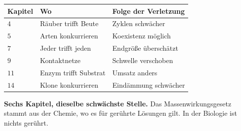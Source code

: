 \begin{merksatz}
\begin{center}
{\small
\renewcommand{\arraystretch}{1.48}
\begin{tabular}{@{}P{1.8cm}P{3.0cm}P{3.4cm}@{}}
\toprule
\textbf{Kapitel} & \textbf{Wo} & \textbf{Folge der Verletzung}\\
\midrule
$4$ & Räuber trifft Beute & Zyklen schwächer\\
$5$ & Arten konkurrieren & Koexistenz möglich\\
$7$ & Jeder trifft jeden & Endgröße überschätzt\\
$9$ & Kontaktnetze & Schwelle verschoben\\
$11$ & Enzym trifft Substrat & Umsatz anders\\
$14$ & Klone konkurrieren & Eindämmung schwächer\\
\bottomrule
\end{tabular}}
\end{center}

\begin{center}
\begin{minipage}{0.9\textwidth}
\textbf{Sechs Kapitel, dieselbe schwächste Stelle.} Das Massenwirkungsgesetz stammt aus der Chemie, wo es für gerührte Lösungen gilt. In der Biologie ist nichts gerührt.
\end{minipage}
\end{center}

\begin{center}
\begin{minipage}{0.88\textwidth}
\end{minipage}
\end{center}
\end{merksatz}


